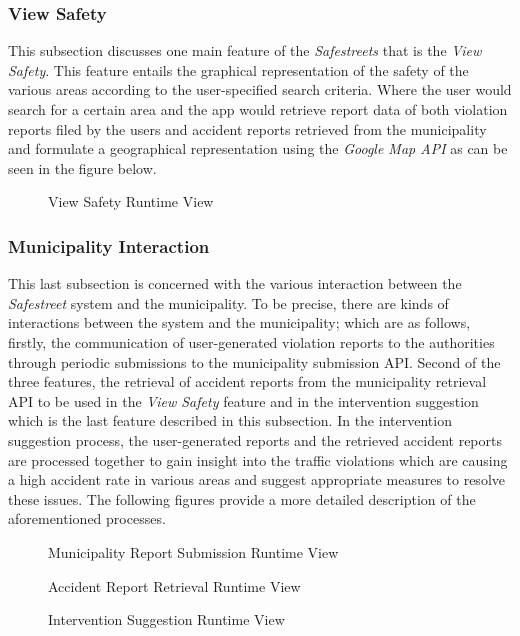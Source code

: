 \subsubsection{View Safety}
This subsection discusses one main feature of the \emph{Safestreets} that is the \emph{View Safety}. This feature entails the graphical representation of the safety of the various areas according to the user-specified search criteria. Where the user would search for a certain area and the app would retrieve report data of both violation reports filed by the users and accident reports retrieved from the municipality and formulate a geographical representation using the \emph{Google Map API} as can be seen in the figure below.
\begin{sidewaysfigure}
\begin{figure}[H]
\caption{View Safety Runtime View}
\label{fig:RuntimeSafe}
\centering

\end{figure}
\end{sidewaysfigure}

\subsubsection{Municipality Interaction}
This last subsection is concerned with the various interaction between the \emph{Safestreet} system and the municipality. To be precise, there are kinds of interactions between the system and the municipality; which are as follows, firstly, the communication of user-generated violation reports to the authorities through periodic submissions to the municipality submission API. Second of the three features, the retrieval of accident reports from the municipality retrieval API to be used in the \emph{View Safety} feature and in the intervention suggestion which is the last feature described in this subsection. In the intervention suggestion process, the user-generated reports and the retrieved accident reports are processed together to gain insight into the traffic violations which are causing a high accident rate in various areas and suggest appropriate measures to resolve these issues. The following figures provide a more detailed description of the aforementioned processes.

\begin{figure}[H]
\caption{Municipality Report Submission Runtime View}
\label{fig:RuntimeSub}
\centering

\end{figure}

\begin{figure}[H]
\caption{Accident Report Retrieval Runtime View}
\label{fig:RuntimeRet}
\centering

\end{figure}

\begin{figure}[H]
\caption{Intervention Suggestion Runtime View}
\label{fig:RuntimeInter}
\centering

\end{figure}
